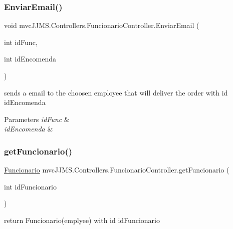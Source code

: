 \subsubsection{\texorpdfstring{Enviar\+Email()}{EnviarEmail()}}
{\footnotesize\ttfamily void mvc\+J\+J\+M\+S.\+Controllers.\+Funcionario\+Controller.\+Enviar\+Email (\begin{DoxyParamCaption}\item[{int}]{id\+Func,  }\item[{int}]{id\+Encomenda }\end{DoxyParamCaption})\hspace{0.3cm}{\ttfamily [inline]}}



sends a email to the choosen employee that will deliver the order with id id\+Encomenda 


\begin{DoxyParams}{Parameters}
{\em id\+Func} & \\
\hline
{\em id\+Encomenda} & \\
\hline
\end{DoxyParams}
\mbox{\label{classmvc_j_j_m_s_1_1_controllers_1_1_funcionario_controller_a921dda2edb269dfe9a32be22d5abe2ad}} 
\subsubsection{\texorpdfstring{get\+Funcionario()}{getFuncionario()}}
{\footnotesize\ttfamily \mbox{\hyperlink{classmvc_j_j_m_s_1_1_models_1_1_funcionario}{Funcionario}} mvc\+J\+J\+M\+S.\+Controllers.\+Funcionario\+Controller.\+get\+Funcionario (\begin{DoxyParamCaption}\item[{int}]{id\+Funcionario }\end{DoxyParamCaption})\hspace{0.3cm}{\ttfamily [inline]}}



return Funcionario(emplyee) with id id\+Funcionario 


